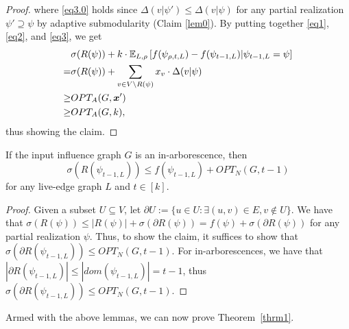 \begin{proof}
where \eqref{eq3.0} holds since $\Delta(v|\psi')\leq \Delta(v|\psi)$ for any partial realization $\psi'\supseteq \psi$ by adaptive submodularity (Claim \ref{lem0}). By putting together \eqref{eq1}, \eqref{eq2}, and \eqref{eq3}, we get
\begin{align*}
& \sigma(R(\psi))+k\cdot \mathbb{E}_{L,\rho}\left[f({\psi}_{\rho,t,L})-f(\psi_{t-1,L})|\psi_{t-1,L}=\psi \right]\\
=& \sigma(R(\psi))+\sum_{v\in V\setminus R(\psi)}x_v\cdot \Delta(v|\psi)\\
\geq & OPT_A(G,\bm x')\\
\geq & OPT_A(G,k),
\end{align*}
thus showing the claim. 
\end{proof}

\begin{lemma}\label{lemm2}
If the input influence graph $G$ is an in-arborescence, then $$
\sigma(R(\psi_{t-1,L}))\leq f(\psi_{t-1,L})+OPT_N(G,t-1)$$
  for any live-edge graph $L$ and $t\in [k]$. 
\end{lemma}
\begin{proof}
Given a subset $U\subseteq V$, let $\partial U:=\{u\in U:\exists (u,v)\in E,v\notin U\}$. We have that $\sigma(R(\psi))\leq |R(\psi)|+\sigma(\partial R(\psi))=f(\psi)+\sigma(\partial R(\psi))$ for any partial realization $\psi$. Thus, to show the claim, it suffices to show that $\sigma(\partial R(\psi_{t-1,L}))\leq OPT_N(G,t-1)$. For in-arborescences, we have that $|\partial R(\psi_{t-1,L})|\leq |dom(\psi_{t-1,L})|=t-1$, thus $\sigma(\partial R(\psi_{t-1,L}))\leq OPT_N(G,t-1)$.
\end{proof}
Armed with the above lemmas, we can now prove Theorem~\ref{thrm1}.

